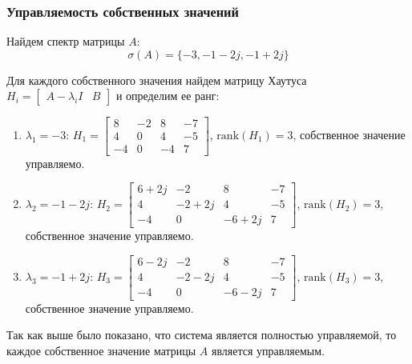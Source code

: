 \subsubsection{Управляемость собственных значений}
Найдем спектр матрицы $A$:
\begin{equation}
    \sigma(A) = \{-3, -1-2j, -1+2j\}
\end{equation}

Для каждого собственного значения найдем матрицу Хаутуса $H_i = \begin{bmatrix} A - \lambda_i I & B \end{bmatrix}$ и определим ее ранг:
\begin{enumerate}
    \item $\lambda_1 = -3$: $H_1 = \begin{bmatrix}
        8 & -2 & 8 & -7\\
        4 & 0 & 4 & -5 \\
        -4 & 0 & -4 & 7
    \end{bmatrix}$, $\text{rank}(H_1) = 3$, собственное значение управляемо.
    \item $\lambda_2 = -1-2j$: $H_2 = \begin{bmatrix}
        6+2j & -2 & 8 & -7\\
        4 & -2+2j & 4 & -5 \\
        -4 & 0 & -6+2j & 7
    \end{bmatrix}$, $\text{rank}(H_2) = 3$, собственное значение управляемо.
    \item $\lambda_3 = -1+2j$: $H_3 = \begin{bmatrix}
        6-2j & -2 & 8 & -7\\
        4 & -2-2j & 4 & -5 \\
        -4 & 0 & -6-2j & 7
    \end{bmatrix}$, $\text{rank}(H_3) = 3$, собственное значение управляемо.
\end{enumerate}
Так как выше было показано, что система является полностью управляемой, то каждое собственное значение матрицы $A$ является управляемым. 

